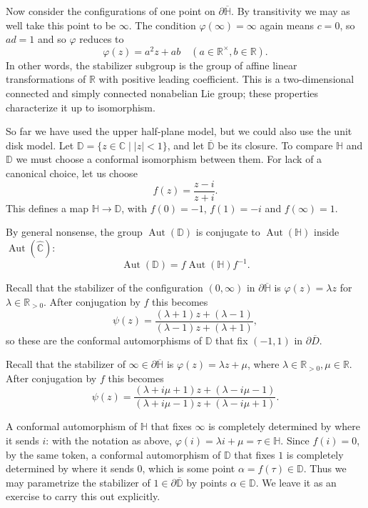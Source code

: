 \documentclass[12pt]{article}
\theoremstyle{definition}
\theoremstyle{remark}
\newcommand{\R}{\mathbb{R}}
\newcommand{\C}{\mathbb{C}}
\DeclareMathOperator{\Aut}{Aut}
\renewcommand{\phi}{\varphi}
\newcommand{\hC}{\widehat{\mathbb{C}}}
\newcommand{\bH}{\mathbb{H}}
\newcommand{\D}{\mathbb{D}}
\begin{document}
Now consider the configurations of one point on $\partial \overline{\bH}$. By transitivity we may as well take this point to be $\infty$. The condition $\phi(\infty)=\infty$ again means $c = 0$, so $ad = 1$ and so $\phi$ reduces to
\begin{equation*}
  \phi(z) = a^{2}z + ab\quad (a\in \R^{\times},b \in \R).
\end{equation*}
In other words, the stabilizer subgroup is the group of affine linear transformations of $\R$ with positive leading coefficient. This is a two-dimensional connected and simply connected nonabelian Lie group; these properties characterize it up to isomorphism.

So far we have used the upper half-plane model, but we could also use the unit disk model. Let $\D = \{z \in \C \mid |z| < 1\}$, and let $\overline{\D}$ be its closure. To compare $\bH$ and $\D$ we must choose a conformal isomorphism between them. For lack of a canonical choice, let us choose
\begin{equation*}
  f(z) = \frac{z-i}{z+i}.
\end{equation*}
This defines a map $\bH \to \D$, with $f(0) = -1$, $f(1) = -i$ and $f(\infty) = 1$.

By general nonsense, the group $\Aut(\D)$ is conjugate to $\Aut(\bH)$ inside $\Aut(\hC)$:
\begin{equation*}
  \Aut(\D) = f\Aut(\bH)f^{-1}.
\end{equation*}

Recall that the stabilizer of the configuration $(0,\infty)$ in $\partial \overline{\bH}$ is $\phi(z) = \lambda z$ for $\lambda \in \R_{> 0}$. After conjugation by $f$ this becomes
\begin{equation*}
  \psi(z) = \frac{(\lambda + 1)z + (\lambda -1)}{(\lambda - 1)z + (\lambda +1)},
\end{equation*}
so these are the conformal automorphisms of $\D$ that fix $(-1,1)$ in $\partial \overline{D}$.

Recall that the stabilizer of $\infty \in \partial \overline{\bH}$ is $\phi(z) = \lambda z + \mu$, where $\lambda  \in \R_{> 0}, \mu \in \R$. After conjugation by $f$ this becomes
\begin{equation*}
  \psi(z) = \frac{(\lambda + i \mu + 1)z + (\lambda - i\mu -1)}{(\lambda + i\mu - 1)z + (\lambda -i \mu +1)}.
\end{equation*}

A conformal automorphism of $\bH$ that fixes $\infty$ is completely determined by where it sends $i$: with the notation as above, $\phi(i) = \lambda i + \mu = \tau \in \bH$. Since $f(i) = 0$, by the same token, a conformal automorphism of $\D$ that fixes $1$ is completely determined by where it sends $0$, which is some point $\alpha = f(\tau)\in \D$. Thus we may parametrize the stabilizer of $1 \in \partial \overline{\D}$ by points $\alpha \in \D$. We leave it as an exercise to carry this out explicitly.
\end{document}
